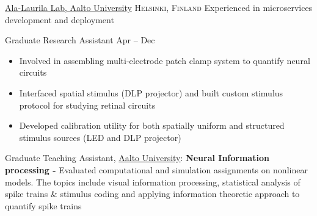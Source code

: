 
\headedsection  %
  {\href{http://ala-laurila.biosci.helsinki.fi/}{Ala-Laurila Lab, Aalto University}}
  {\textsc{Helsinki, Finland}} 
  {\newline{}Experienced in microservices development and deployment} 
  {%
  \headedsubsection
    {Graduate Research Assistant}
    {Apr  -- Dec }
    {
      \begin{itemize}
        \item Involved in assembling multi-electrode patch clamp system to quantify neural circuits
        \item Interfaced spatial stimulus (DLP projector) and built custom stimulus protocol for studying retinal circuits
        \item Developed calibration utility for both spatially uniform and structured stimulus sources (LED and DLP projector)
      \end{itemize}
    }
}

  \vspace{0.5em}

\inlineheadsection
{Graduate Teaching Assistant, \href{http://www.aalto.fi}{Aalto University}:}
{\textbf{Neural Information processing - }Evaluated computational and simulation assignments on  nonlinear models. The topics include visual information processing, statistical analysis of spike trains 
\& stimulus coding and applying information theoretic approach to quantify spike trains}
